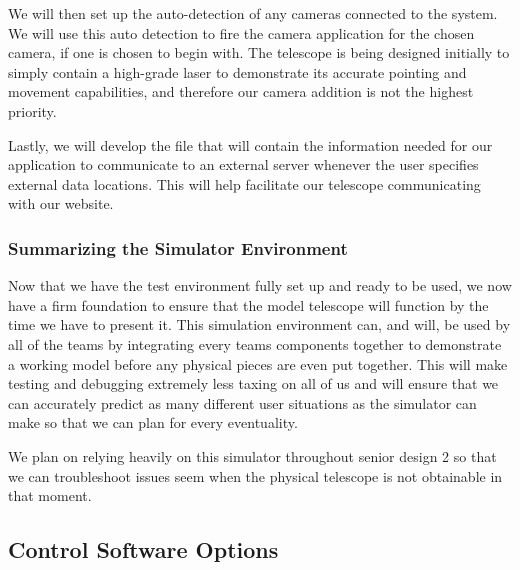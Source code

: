 \documentclass[12pt]{article}
\begin{document}
We will then set up the auto-detection of any cameras connected to the system. We will use this auto detection to fire the camera application for the chosen camera, if one is chosen to begin with. The telescope is being designed initially to simply contain a high-grade laser to demonstrate its accurate pointing and movement capabilities, and therefore our camera addition is not the highest priority.

Lastly, we will develop the file that will contain the information needed for our application to communicate to an external server whenever the user specifies external data locations. This will help facilitate our telescope communicating with our website.



\subsubsection{Summarizing the Simulator Environment}

Now that we have the test environment fully set up and ready to be used, we now have a firm foundation to ensure that the model telescope will function by the time we have to present it. This simulation environment can, and will, be used by all of the teams by integrating every teams components together to demonstrate a working model before any physical pieces are even put together. This will make testing and debugging extremely less taxing on all of us and will ensure that we can accurately predict as many different user situations as the simulator can make so that we can plan for every eventuality.

We plan on relying heavily on this simulator throughout senior design 2 so that we can troubleshoot issues seem when the physical telescope is not obtainable in that moment.

\subsection{Control Software Options}
\end{document}
